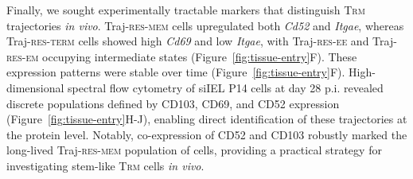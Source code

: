 Finally, we sought experimentally tractable markers that distinguish T\textsc{rm} trajectories \emph{in vivo}. Traj-\textsc{res-mem} cells upregulated both \emph{Cd52} and \emph{Itgae}, whereas Traj-\textsc{res-term} cells showed high \emph{Cd69} and low \emph{Itgae}, with Traj-\textsc{res-ee} and Traj-\textsc{res-em} occupying intermediate states (Figure~\ref{fig:tissue-entry}F). These expression patterns were stable over time (Figure~\ref{fig:tissue-entry}F). High-dimensional spectral flow cytometry of siIEL P14 cells at day 28 p.i. revealed discrete populations defined by CD103, CD69, and CD52 expression (Figure~\ref{fig:tissue-entry}H-J), enabling direct identification of these trajectories at the protein level. Notably, co-expression of CD52 and CD103 robustly marked the long-lived Traj-\textsc{res-mem} population of cells, providing a practical strategy for investigating stem-like T\textsc{rm} cells \emph{in vivo}.

